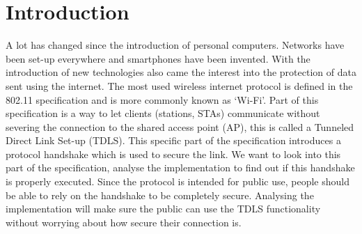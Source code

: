 \chapter{Introduction}\label{introduction}

\iffalse
The introduction of your bachelor thesis introduces the research area, the
research hypothesis, and the scientific contributions of your work.
A good narrative structure is the one suggested by Simon Peyton Jones
\cite{ieee80211}:
%
\begin{itemize}
\item describe the problem / research question
\item motivate why this problem must be solved
\item demonstrate that a (new) solution is needed
\item explain the intuition behind your solution
\item motivate why / how your solution solves the problem (this is technical)
\item explain how it compares with related work
\end{itemize}
\fi


A lot has changed since the introduction of personal computers. Networks have been set-up everywhere and smartphones have been invented. With the introduction of new technologies also came the interest into the protection of data sent using the internet. The most used wireless internet protocol is defined in the 802.11 specification \cite{ieee80211} and is more commonly known as ‘Wi-Fi’. Part of this specification is a way to let clients (stations, STAs) communicate without severing the connection to the shared access point (AP), this is called a Tunneled Direct Link Set-up (TDLS).  This specific part of the specification introduces a protocol handshake which is used to secure the link. We want to look into this part of the specification, analyse the implementation to find out if this handshake is properly executed. Since the protocol is intended for public use, people should be able to rely on the handshake to be completely secure. Analysing the implementation will make sure the public can use the TDLS functionality without worrying about how secure their connection is.